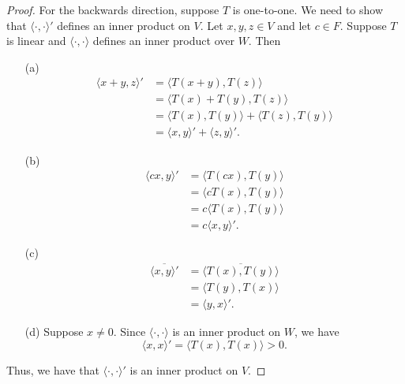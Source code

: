 \begin{proof}
For the backwards direction, suppose \( T  \) is one-to-one. We need to show that \( \langle \cdot , \cdot \rangle' \) defines an inner product on \( V  \). Let \( x,y,z \in V  \) and let \( c \in F  \). Suppose \( T  \) is linear and \( \langle \cdot ,  \cdot  \rangle  \) defines an inner product over \( W  \). Then
\begin{enumerate}
    \item[(a)] 
        \begin{align*}
            \langle x + y  ,  z  \rangle' &= \langle  T(x+y)  , T(z) \rangle \\
                                          &=  \langle T(x) + T(y)  , T(z) \rangle \\
                                          &= \langle T(x)  , T(y) \rangle + \langle T(z)  , T(y)   \rangle \\
                                          &=  \langle x , y \rangle' + \langle z , y \rangle'.
        \end{align*}
    \item[(b)] 
        \begin{align*}
            \langle cx , y \rangle' &= \langle  T(cx)  , T(y) \rangle  \\
                                    &=  \langle c T(x)  , T(y) \rangle \\
                                    &=  c \langle T(x)  , T(y) \rangle \\
                                    &=  c \langle x  , y \rangle'.
        \end{align*}
    \item[(c)] 
        \begin{align*}
            \overline{\langle x , y \rangle'} &= \overline{\langle T(x)  , T(y) \rangle}  \\
                                              &=  \langle T(y)  , T(x) \rangle \\
                                              &=  \langle y , x \rangle'.
        \end{align*}
    \item[(d)] Suppose \( x \neq 0  \). Since \( \langle \cdot , \cdot \rangle \) is an inner product on \( W  \), we have 
        \[  \langle x , x \rangle' = \langle T(x)  , T(x)  \rangle > 0. \]
\end{enumerate}
Thus, we have that \( \langle \cdot , \cdot \rangle'  \) is an inner product on \( V  \).
\end{proof}

